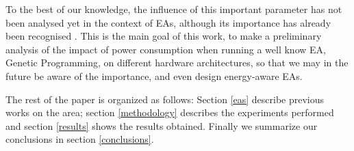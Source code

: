 To the best of our knowledge, the influence of this important
parameter has not been analysed yet in the context of EAs, although
its importance has already been recognised \cite{ephemeral}.  This is
the main goal of this work, to make a preliminary analysis of the
impact of power consumption when running a well know EA, Genetic Programming, on different hardware architectures, so that we may in the future be aware of the
importance, and even design energy-aware EAs. 

The rest of the paper is organized as follows:  Section \ref{eas}
describe previous works on the area;  section \ref{methodology}
describes the experiments performed and section \ref{results} shows
the results obtained.  Finally we summarize our conclusions in section
\ref{conclusions}. 


